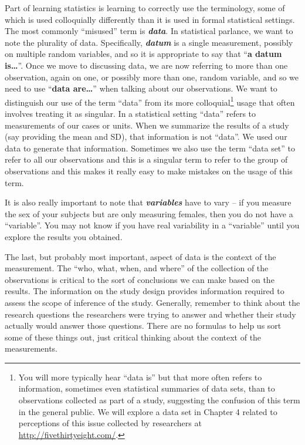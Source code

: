 \documentclass[]{book}
\let\rmarkdownfootnote\footnote%
\def\footnote{\protect\rmarkdownfootnote}
\theoremstyle{definition}
\theoremstyle{definition}
\theoremstyle{remark}
\begin{document}
Part of learning statistics is learning to correctly use the
terminology, some of which is used colloquially differently than it is
used in formal statistical settings. The most commonly ``misused'' term
is \textbf{\emph{data}}. In statistical parlance, we want to note the
plurality of data. Specifically, \textbf{\emph{datum}} is a single
measurement, possibly on multiple random variables, and so it is
appropriate to say that ``\textbf{a datum is\ldots{}}''. Once we move to
discussing data, we are now referring to more than one observation,
again on one, or possibly more than one, random variable, and so we need
to use ``\textbf{data are\ldots{}}'' when talking about our
observations. We want to distinguish our use of the term ``data'' from
its more colloquial\footnote{You will more typically hear ``data is''
  but that more often refers to information, sometimes even statistical
  summaries of data sets, than to observations collected as part of a
  study, suggesting the confusion of this term in the general public. We
  will explore a data set in Chapter 4 related to perceptions of this
  issue collected by researchers at \url{http://fivethirtyeight.com/}.}
usage that often involves treating it as singular. In a statistical
setting ``data'' refers to measurements of our cases or units. When we
summarize the results of a study (say providing the mean and SD), that
information is not ``data''. We used our data to generate that
information. Sometimes we also use the term ``data set'' to refer to all
our observations and this is a singular term to refer to the group of
observations and this makes it really easy to make mistakes on the usage
of this term.

It is also really important to note that \textbf{\emph{variables}} have
to vary -- if you measure the sex of your subjects but are only
measuring females, then you do not have a ``variable''. You may not know
if you have real variability in a ``variable'' until you explore the
results you obtained.

The last, but probably most important, aspect of data is the context of
the measurement. The ``who, what, when, and where'' of the collection of
the observations is critical to the sort of conclusions we can make
based on the results. The information on the study design provides
information required to assess the scope of inference of the study.
Generally, remember to think about the research questions the
researchers were trying to answer and whether their study actually would
answer those questions. There are no formulas to help us sort some of
these things out, just critical thinking about the context of the
measurements.
\end{document}
